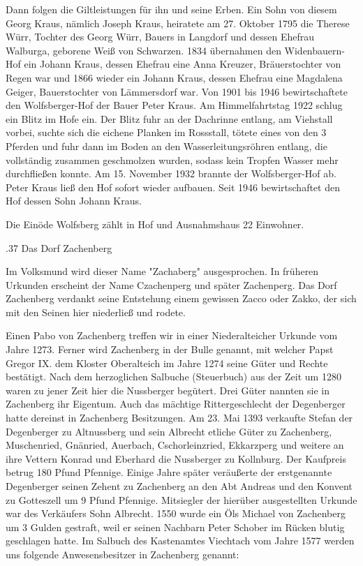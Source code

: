 Dann folgen die Giltleistungen für ihn und seine Erben. Ein Sohn von diesem
Georg Kraus, nämlich Joseph Kraus, heiratete am 27. Oktober 1795 die Therese
Würr, Tochter des Georg Würr, Bauers in Langdorf und dessen Ehefrau Walburga,
geborene Weiß von Schwarzen. 1834 übernahmen den Widenbauern-Hof ein Johann
Kraus, dessen Ehefrau eine Anna Kreuzer, Bräuerstochter von Regen war und 1866
wieder ein Johann Kraus, dessen Ehefrau eine Magdalena Geiger, Bauerstochter von
Lämmersdorf war. Von 1901 bis 1946 bewirtschaftete den Wolfsberger-Hof der Bauer
Peter Kraus. Am Himmelfahrtstag 1922 schlug ein Blitz im Hofe ein. Der Blitz
fuhr an der Dachrinne entlang, am Viehstall vorbei, suchte sich die eichene
Planken im Rossstall, tötete eines von den 3 Pferden und fuhr dann im Boden an
den Wasserleitungsröhren entlang, die vollständig zusammen geschmolzen wurden,
sodass kein Tropfen Wasser mehr durchfließen konnte. Am 15. November 1932
brannte der Wolfsberger-Hof ab. Peter Kraus ließ den Hof sofort wieder aufbauen.
Seit 1946 bewirtschaftet den Hof dessen Sohn Johann Kraus.

Die Einöde Wolfsberg zählt in Hof und Ausnahmshaus 22 Einwohner.

.37 Das Dorf Zachenberg

Im Volksmund wird dieser Name "Zachaberg" ausgesprochen. In früheren Urkunden
erscheint der Name Czachenperg und später Zachenperg. Das Dorf Zachenberg
verdankt seine Entstehung einem gewissen Zacco oder Zakko, der sich mit den
Seinen hier niederließ und rodete.

Einen Pabo von Zachenberg treffen wir in einer Niederalteicher Urkunde vom Jahre
1273. Ferner wird Zachenberg in der Bulle genannt, mit welcher Papst Gregor IX.
dem Kloster Oberalteich im Jahre 1274 seine Güter und Rechte bestätigt. Nach dem
herzoglichen Salbuche (Steuerbuch) aus der Zeit um 1280 waren zu jener Zeit hier
die Nussberger begütert. Drei Güter nannten sie in Zachenberg ihr Eigentum. Auch
das mächtige Rittergeschlecht der Degenberger hatte dereinst in Zachenberg
Besitzungen. Am 23. Mai 1393 verkaufte Stefan der Degenberger zu Altnussberg und
sein Albrecht etliche Güter zu Zachenberg, Muschenried, Gnänried, Auerbach,
Cschorleinzried, Ekkarzperg und weitere an ihre Vettern Konrad und Eberhard die
Nussberger zu Kollnburg. Der Kaufpreis betrug 180 Pfund Pfennige. Einige Jahre
später veräußerte der erstgenannte Degenberger seinen Zehent zu Zachenberg an
den Abt Andreas und den Konvent zu Gotteszell um 9 Pfund Pfennige. Mitsiegler
der hierüber ausgestellten Urkunde war des Verkäufers Sohn Albrecht. 1550 wurde
ein Öls Michael von Zachenberg um 3 Gulden gestraft, weil er seinen Nachbarn
Peter Schober im Rücken blutig geschlagen hatte. Im Salbuch des Kastenamtes
Viechtach vom Jahre 1577 werden uns folgende Anwesensbesitzer in Zachenberg
genannt:



